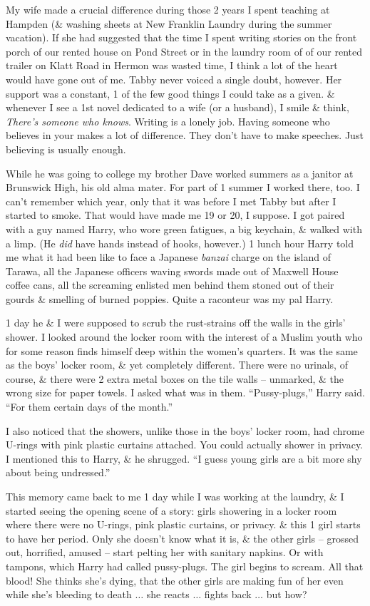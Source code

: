 \documentclass{article}
\numberwithin{equation}{section}
\begin{document}
My wife made a crucial difference during those 2 years I spent teaching at Hampden (\& washing sheets at New Franklin Laundry during the summer vacation). If she had suggested that the time I spent writing stories on the front porch of our rented house on Pond Street or in the laundry room of of our rented trailer on Klatt Road in Hermon was wasted time, I think a lot of the heart would have gone out of me. Tabby never voiced a single doubt, however. Her support was a constant, 1 of the few good things I could take as a given. \& whenever I see a 1st novel dedicated to a wife (or a husband), I smile \& think, \textit{There's someone who knows}. Writing is a lonely job. Having someone who believes in your makes a lot of difference. They don't have to make speeches. Just believing is usually enough.

 While he was going to college my brother Dave worked summers as a janitor at Brunswick High, his old alma mater. For part of 1 summer I worked there, too. I can't remember which year, only that it was before I met Tabby but after I started to smoke. That would have made me 19 or 20, I suppose. I got paired with a guy named Harry, who wore green fatigues, a big keychain, \& walked with a limp. (He \textit{did} have hands instead of hooks, however.) 1 lunch hour Harry told me what it had been like to face a Japanese \textit{banzai} charge on the island of Tarawa, all the Japanese officers waving swords made out of Maxwell House coffee cans, all the screaming enlisted men behind them stoned out of their gourds \& smelling of burned poppies. Quite a raconteur was my pal Harry.

1 day he \& I were supposed to scrub the rust-strains off the walls in the girls' shower. I looked around the locker room with the interest of a Muslim youth who for some reason finds himself deep within the women's quarters. It was the same as the boys' locker room, \& yet completely different. There were no urinals, of course, \& there were 2 extra metal boxes on the tile walls -- unmarked, \& the wrong size for paper towels. I asked what was in them. ``Pussy-plugs,'' Harry said. ``For them certain days of the month.''

I also noticed that the showers, unlike those in the boys' locker room, had chrome U-rings with pink plastic curtains attached. You could actually shower in privacy. I mentioned this to Harry, \& he shrugged. ``I guess young girls are a bit more shy about being undressed.''

This memory came back to me 1 day while I was working at the laundry, \& I started seeing the opening scene of a story: girls showering in a locker room where there were no U-rings, pink plastic curtains, or privacy. \& this 1 girl starts to have her period. Only she doesn't know what it is, \& the other girls -- grossed out, horrified, amused -- start pelting her with sanitary napkins. Or with tampons, which Harry had called pussy-plugs. The girl begins to scream. All that blood! She thinks she's dying, that the other girls are making fun of her even while she's bleeding to death $\ldots$ she reacts $\ldots$ fights back $\ldots$ but how?
\end{document}

